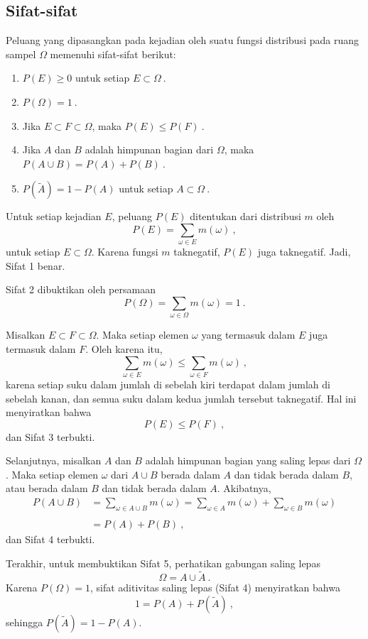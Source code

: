 

\subsection*{Sifat-sifat}
\nopagebreak
\begin{theorem}\label{thm 1.1}
Peluang yang dipasangkan pada kejadian oleh suatu fungsi distribusi pada ruang sampel
$\Omega$ 
memenuhi sifat-sifat berikut: 
\begin{enumerate}
\item  $P(E) \geq 0$ untuk setiap $E \subset \Omega\ $.
\item  $P(\Omega) = 1\ $.
\item  Jika $E \subset F \subset \Omega$, maka $P(E) \leq P(F)\ $.
\item  Jika $A$ dan $B$ adalah himpunan bagian  dari $\Omega$, maka $P(A
\cup B)
= P(A) + P(B)\ $.
\item  $P(\tilde A) = 1 - P(A)$ untuk setiap $A \subset \Omega\ $.
\end{enumerate}
\proof
Untuk setiap kejadian $E$, peluang $P(E)$ ditentukan dari distribusi $m$
oleh
$$
P(E) = \sum_{\omega \in E} m(\omega)\ ,
$$
untuk setiap $E \subset \Omega$.
Karena fungsi $m$ taknegatif, $P(E)$ juga
taknegatif.  Jadi, Sifat 1 benar.  
\par
Sifat 2 dibuktikan oleh persamaan
$$
P(\Omega) = \sum_{\omega \in \Omega} m(\omega) = 1\ .
$$
\par
Misalkan $E \subset F \subset \Omega$.  Maka setiap elemen $\omega$ yang
termasuk dalam $E$ juga termasuk dalam $F$.  Oleh karena itu,
$$
\sum_{\omega \in E} m(\omega) \leq \sum_{\omega \in F} m(\omega)\ ,
$$
karena setiap suku dalam jumlah di sebelah kiri terdapat dalam jumlah di sebelah kanan, dan semua suku 
dalam kedua jumlah tersebut taknegatif.  Hal ini menyiratkan bahwa
$$P(E) \le P(F)\ ,$$
dan Sifat 3 terbukti.  
\par
Selanjutnya, misalkan $A$ dan $B$ adalah himpunan bagian yang saling lepas dari
$\Omega$.  Maka setiap elemen $\omega$ dari $A \cup B$ berada dalam $A$ dan
tidak berada
dalam $B$, atau berada dalam $B$ dan tidak berada dalam $A$.  Akibatnya,
$$\begin{array}{ll}
P(A \cup B) &= \sum_{\omega \in A \cup B} m(\omega) = \sum_{\omega \in A}
m(\omega) + \sum_{\omega \in B} m(\omega) \\
            &                             \\
            &= P(A) + P(B)\ ,
\end{array}
$$
dan Sifat 4 terbukti.  
\par
Terakhir, untuk membuktikan Sifat 5, perhatikan gabungan saling lepas
$$
\Omega = A \cup \tilde A\ .
$$
Karena $P(\Omega) = 1$, sifat aditivitas saling lepas (Sifat 4) menyiratkan
bahwa
$$
1 = P(A) + P(\tilde A)\ ,
$$
sehingga $P(\tilde A) = 1 - P(A)$.
\end{theorem}
